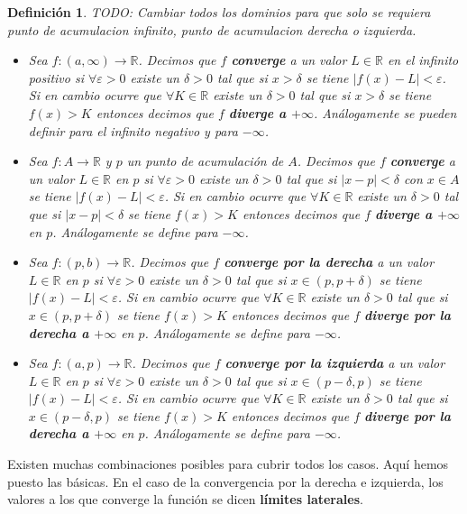 \documentclass{article}
\newtheorem{define}{Definición}
\newcommand{\reales}{\mathbb{R}}
\begin{document}
\begin{define}
	TODO: Cambiar todos los dominios para que solo se requiera punto de acumulacion infinito, punto de acumulacion derecha o izquierda.
	\begin{itemize}
		\item
		Sea $f: (a, \infty) \rightarrow \reales$. Decimos que $f$ \textbf{converge} a un valor $L\in \reales$ en el infinito positivo si $\forall \varepsilon > 0$ existe un $\delta > 0$ tal que si $x > \delta$ se tiene $|f(x) - L| < \varepsilon$. Si en cambio ocurre que $\forall K \in \reales$ existe un $\delta > 0$ tal que si $x > \delta$ se tiene $f(x) > K$ entonces decimos que $f$ \textbf{diverge a $+\infty$}. Análogamente se pueden definir para el infinito negativo y para $-\infty$.
		\item
		Sea $f: A \rightarrow \reales$ y $p$ un punto de acumulación de $A$. Decimos que $f$ \textbf{converge} a un valor $L\in \reales$ en $p$ si $\forall \varepsilon > 0$ existe un $\delta > 0$ tal que si $|x - p| < \delta$ con $x \in A$ se tiene $|f(x) - L| < \varepsilon$. Si en cambio ocurre que $\forall K \in \reales$ existe un $\delta > 0$ tal que si $|x - p| < \delta$ se tiene $f(x) > K$ entonces decimos que $f$ \textbf{diverge a $+\infty$} en $p$. Análogamente se define para $-\infty$.
		\item
		Sea $f: (p, b) \rightarrow \reales$. Decimos que $f$ \textbf{converge por la derecha} a un valor $L \in \reales$ en $p$ si $\forall \varepsilon > 0$ existe un $\delta > 0$ tal que si $x \in (p, p + \delta)$ se tiene $|f(x) - L| < \varepsilon$. Si en cambio ocurre que $\forall K \in \reales$ existe un $\delta > 0$ tal que si $x \in (p, p + \delta)$ se tiene $f(x) > K$ entonces decimos que $f$ \textbf{diverge por la derecha a $+\infty$} en $p$. Análogamente se define para $-\infty$.		
		\item
		Sea $f: (a, p) \rightarrow \reales$. Decimos que $f$ \textbf{converge por la izquierda} a un valor $L \in \reales$ en $p$ si $\forall \varepsilon > 0$ existe un $\delta > 0$ tal que si $x \in (p - \delta, p)$ se tiene $|f(x) - L| < \varepsilon$. Si en cambio ocurre que $\forall K \in \reales$ existe un $\delta > 0$ tal que si $x \in (p - \delta, p)$ se tiene $f(x) > K$ entonces decimos que $f$ \textbf{diverge por la derecha a $+\infty$} en $p$. Análogamente se define para $-\infty$.
	\end{itemize}
\end{define}

Existen muchas combinaciones posibles para cubrir todos los casos. Aquí hemos puesto las básicas. En el caso de la convergencia por la derecha e izquierda, los valores a los que converge la función se dicen \textbf{límites laterales}.
\end{document}
